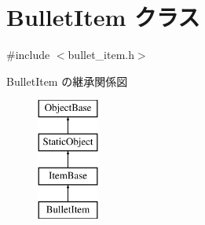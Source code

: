 \hypertarget{class_bullet_item}{}\section{Bullet\+Item クラス}
\label{class_bullet_item}


{\ttfamily \#include $<$bullet\+\_\+item.\+h$>$}

Bullet\+Item の継承関係図\begin{figure}[H]
\begin{center}
\leavevmode
\includegraphics[height=4.000000cm]{class_bullet_item}
\end{center}
\end{figure}
